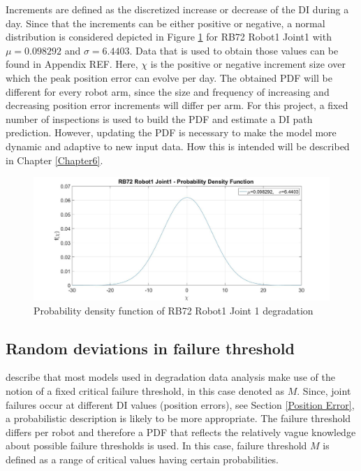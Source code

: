 Increments are defined as the discretized increase or decrease of the DI during a day. Since that the increments can be either positive or negative, a normal distribution is considered depicted in Figure \ref{fig:RB72R1J1PDF} for RB72 Robot1 Joint1 with $\mu=0.098292$ and $\sigma=6.4403$. Data that is used to obtain those values can be found in Appendix REF. Here, $\chi$ is the positive or negative increment size over which the peak position error can evolve per day. The obtained PDF will be different for every robot arm, since the size and frequency of increasing and decreasing position error increments will differ per arm. For this project, a fixed number of inspections is used to build the PDF and estimate a DI path prediction. However, updating the PDF is necessary to make the model more dynamic and adaptive to new input data. How this is intended will be described in Chapter \ref{Chapter6}.

\begin{figure}[ht]
\centering
\includegraphics[width=\textwidth]{Figures/RB72R1J1PDF}
\caption[Probability density function of RB72 Robot1 Joint 1 degradation]{Probability density function of RB72 Robot1 Joint 1 degradation} \label{fig:RB72R1J1PDF}
\end{figure}

\subsection{Random deviations in failure threshold} \label{Random threshold}
\citet{Usynin2008} describe that most models used in degradation data analysis make use of the notion of a fixed critical failure threshold, in this case denoted as $M$. Since, joint failures occur at different DI values (position errors), see Section \ref{Position Error}, a probabilistic description is likely to be more appropriate. The failure threshold differs per robot and therefore a PDF that reflects the relatively vague knowledge about possible failure thresholds is used. In this case, failure threshold $M$ is defined as a range of critical values having certain probabilities. 

